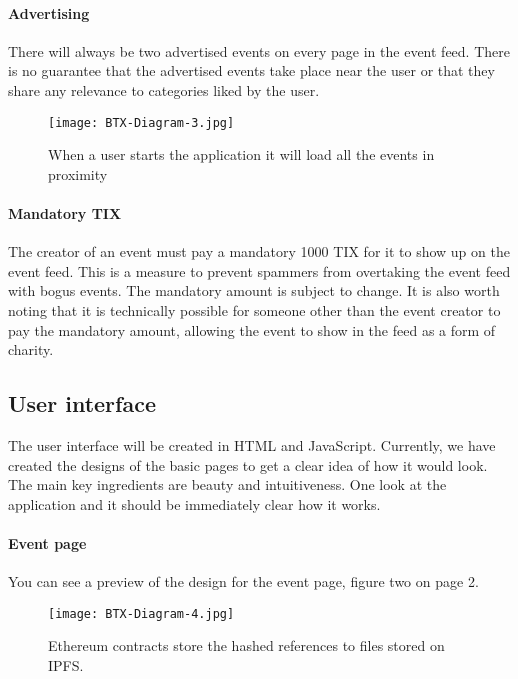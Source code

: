 \documentclass[a4paper]{article}
\begin{document}
\paragraph{Advertising} There will always be two advertised events on every page in the event feed. There is no guarantee that the advertised events take place near the user or that they share any relevance to categories liked by the user.

\begin{figure}
\centering
\texttt{[image: BTX-Diagram-3.jpg]}
\caption{\label{fig:BTX-Diagram-3}When a user starts the application it will load all the events in proximity}
\end{figure}

\paragraph{Mandatory TIX} The creator of an event must pay a mandatory 1000 TIX for it to show up on the event feed. This is a measure to prevent spammers from overtaking the event feed with bogus events. The mandatory amount is subject to change. It is also worth noting that it is technically possible for someone other than the event creator to pay the mandatory amount, allowing the event to show in the feed as a form of charity.


\subsection{User interface}
The user interface will be created in HTML and JavaScript. Currently, we have created the designs of the basic pages to get a clear idea of how it would look. The main key ingredients are beauty and intuitiveness. One look at the application and it should be immediately clear how it works. 

\paragraph{Event page} You can see a preview of the design for the event page, figure two on page 2.


\begin{figure}
\centering
\texttt{[image: BTX-Diagram-4.jpg]}
\caption{\label{fig:BTX-Diagram-4}Ethereum contracts store the hashed references to files stored on IPFS.}
\end{figure}
\end{document}

